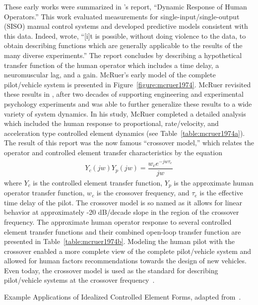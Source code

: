 These early works were summarized in \citeauthor{mcruer_dynamic_1957}'s report, ``Dynamic Response of Human Operators.''
This work evaluated measurements for single-input/single-output (SISO) manual control systems and developed predictive models consistent with this data.
Indeed, \citeauthor*{mcruer_dynamic_1957} wrote, ``[i]t is possible, without doing violence to the data, to obtain describing functions which are generally applicable to the results of the many diverse experiments.''
The report concludes by describing a hypothetical transfer function of the human operator which includes a time delay, a neuromuscular lag, and a gain.
McRuer's early model of the complete pilot/vehicle system is presented in Figure~\ref{figure:mcruer1974}.
McRuer revisited these results in \citeyear{mcruer_mathematical_1974}, after two decades of supporting engineering and experimental psychology experiments and was able to further generalize these results to a wide variety of system dynamics.
In his study, McRuer completed a detailed analysis which included the human response to proportional, rate/velocity, and acceleration type controlled element dynamics (see Table~\ref{table:mcruer1974a}).
The result of this report was the now famous ``crossover model,'' which relates the operator and controlled element transfer characteristics by the equation
\begin{align}
    Y_c(jw) Y_p(jw) = \dfrac{w_c e^{-jw \tau_e}}{jw}
\end{align}
where $Y_c$ is the controlled element transfer function, $Y_p$ is the approximate human operator transfer function, $w_c$ is the crossover frequency, and $\tau_e$ is the effective time delay of the pilot.
The crossover model is so named as it allows for linear behavior at approximately -20 dB/decade slope in the region of the crossover frequency.
The approximate human operator response to several controlled element transfer functions and their combined open-loop transfer function are presented in Table~\ref{table:mcruer1974b}.
Modeling the human pilot with the crossover enabled a more complete view of the complete pilot/vehicle system and allowed for human factors recommendations towards the design of new vehicles.
Even today, the crossover model is used as the standard for describing pilot/vehicle systems at the crossover frequency~\citep{mcruer_human_1965, mcruer_mathematical_1974, xu_review_2017}.

\begin{table}[tb]
    \centering
    \caption[Example Applications of Idealized Controlled Element Forms]{Example Applications of Idealized Controlled Element Forms, adapted from~\citet{mcruer_mathematical_1974}.}
    \label{table:mcruer1974a}
\end{table}

